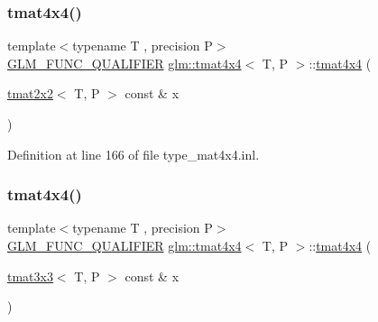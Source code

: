 \mbox{\label{structglm_1_1tmat4x4_ab8f61071f4bcaadf761d930e31ae2bbc}} 
\subsubsection{\texorpdfstring{tmat4x4()}{tmat4x4()}\hspace{0.1cm}{\footnotesize\ttfamily [11/22]}}
{\footnotesize\ttfamily template$<$typename T , precision P$>$ \\
\mbox{\hyperlink{setup_8hpp_a33fdea6f91c5f834105f7415e2a64407}{G\+L\+M\+\_\+\+F\+U\+N\+C\+\_\+\+Q\+U\+A\+L\+I\+F\+I\+ER}} \mbox{\hyperlink{structglm_1_1tmat4x4}{glm\+::tmat4x4}}$<$ T, P $>$\+::\mbox{\hyperlink{structglm_1_1tmat4x4}{tmat4x4}} (\begin{DoxyParamCaption}\item[{\mbox{\hyperlink{structglm_1_1tmat2x2}{tmat2x2}}$<$ T, P $>$ const \&}]{x }\end{DoxyParamCaption})}



Definition at line 166 of file type\+\_\+mat4x4.\+inl.

\mbox{\label{structglm_1_1tmat4x4_a067e574eda5790e829f471ef564b3580}} 
\subsubsection{\texorpdfstring{tmat4x4()}{tmat4x4()}\hspace{0.1cm}{\footnotesize\ttfamily [12/22]}}
{\footnotesize\ttfamily template$<$typename T , precision P$>$ \\
\mbox{\hyperlink{setup_8hpp_a33fdea6f91c5f834105f7415e2a64407}{G\+L\+M\+\_\+\+F\+U\+N\+C\+\_\+\+Q\+U\+A\+L\+I\+F\+I\+ER}} \mbox{\hyperlink{structglm_1_1tmat4x4}{glm\+::tmat4x4}}$<$ T, P $>$\+::\mbox{\hyperlink{structglm_1_1tmat4x4}{tmat4x4}} (\begin{DoxyParamCaption}\item[{\mbox{\hyperlink{structglm_1_1tmat3x3}{tmat3x3}}$<$ T, P $>$ const \&}]{x }\end{DoxyParamCaption})}



